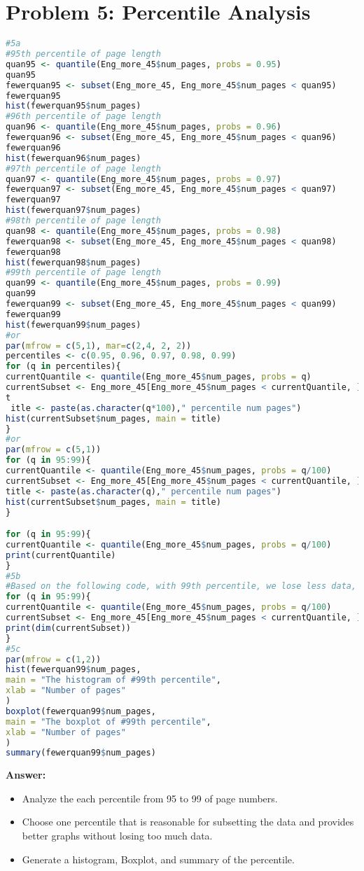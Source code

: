 \documentclass[12pt]{article}
\begin{document}
\section*{Problem 5: Percentile Analysis}
\begin{lstlisting}[language=R]
#5a 
#95th percentile of page length 
quan95 <- quantile(Eng_more_45$num_pages, probs = 0.95) 
quan95 
fewerquan95 <- subset(Eng_more_45, Eng_more_45$num_pages < quan95) 
fewerquan95 
hist(fewerquan95$num_pages) 
#96th percentile of page length 
quan96 <- quantile(Eng_more_45$num_pages, probs = 0.96) 
fewerquan96 <- subset(Eng_more_45, Eng_more_45$num_pages < quan96) 
fewerquan96 
hist(fewerquan96$num_pages) 
#97th percentile of page length 
quan97 <- quantile(Eng_more_45$num_pages, probs = 0.97) 
fewerquan97 <- subset(Eng_more_45, Eng_more_45$num_pages < quan97) 
fewerquan97 
hist(fewerquan97$num_pages) 
#98th percentile of page length 
quan98 <- quantile(Eng_more_45$num_pages, probs = 0.98) 
fewerquan98 <- subset(Eng_more_45, Eng_more_45$num_pages < quan98) 
fewerquan98 
hist(fewerquan98$num_pages) 
#99th percentile of page length 
quan99 <- quantile(Eng_more_45$num_pages, probs = 0.99) 
quan99 
fewerquan99 <- subset(Eng_more_45, Eng_more_45$num_pages < quan99) 
fewerquan99 
hist(fewerquan99$num_pages) 
#or 
par(mfrow = c(5,1), mar=c(2,4, 2, 2)) 
percentiles <- c(0.95, 0.96, 0.97, 0.98, 0.99) 
for (q in percentiles){ 
currentQuantile <- quantile(Eng_more_45$num_pages, probs = q) 
currentSubset <- Eng_more_45[Eng_more_45$num_pages < currentQuantile, ] 
t
 itle <- paste(as.character(q*100)," percentile num pages") 
hist(currentSubset$num_pages, main = title) 
} 
#or 
par(mfrow = c(5,1)) 
for (q in 95:99){ 
currentQuantile <- quantile(Eng_more_45$num_pages, probs = q/100) 
currentSubset <- Eng_more_45[Eng_more_45$num_pages < currentQuantile, ] 
title <- paste(as.character(q)," percentile num pages") 
hist(currentSubset$num_pages, main = title) 
}

for (q in 95:99){ 
currentQuantile <- quantile(Eng_more_45$num_pages, probs = q/100) 
print(currentQuantile) 
} 
#5b 
#Based on the following code, with 99th percentile, we lose less data, so we should select 99th 
for (q in 95:99){  
currentQuantile <- quantile(Eng_more_45$num_pages, probs = q/100) 
currentSubset <- Eng_more_45[Eng_more_45$num_pages < currentQuantile, ] 
print(dim(currentSubset)) 
} 
#5c 
par(mfrow = c(1,2))  
hist(fewerquan99$num_pages,  
main = "The histogram of #99th percentile", 
xlab = "Number of pages" 
) 
boxplot(fewerquan99$num_pages,  
main = "The boxplot of #99th percentile", 
xlab = "Number of pages" 
) 
summary(fewerquan99$num_pages) 
\end{lstlisting}
\textbf{Answer:}
\begin{itemize}
    \item Analyze the each percentile from 95 to 99 of page numbers.
    \item Choose one percentile that is reasonable for subsetting the data and provides better graphs without losing too much data.
    \item Generate a histogram, Boxplot, and summary  of the percentile.
\end{itemize}
\end{document}
